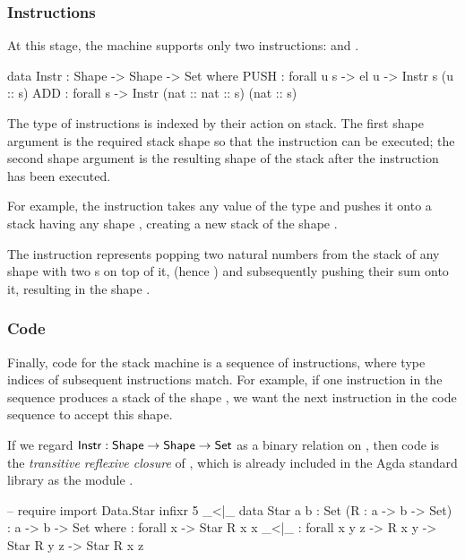 \subsubsection{Instructions}

At this stage, the machine supports only two instructions: 
and .
\begin{code}
  data Instr : Shape -> Shape -> Set where
    PUSH : forall {u s} -> el u -> Instr s (u :: s)
    ADD : forall s -> Instr (nat :: nat :: s) (nat :: s)
\end{code}
The type of instructions is indexed by their action on stack. The first shape
argument is the required stack shape so that the instruction can be executed;
the second shape argument is the resulting shape of the stack after the
instruction has been executed.

For example, the instruction  takes any value of the type 
and pushes it onto a stack having any shape , creating a new
stack of the shape .

The instruction  represents popping two natural numbers from the
stack of any shape with two s on top of it, (hence
)
and subsequently pushing their sum onto it, resulting in the shape
.

\subsubsection{Code}

Finally, code for the stack machine is a sequence of instructions, where
type indices of subsequent instructions match. For example, if one instruction
in the sequence produces a stack of the shape ,
we want the next instruction in the code sequence to accept this shape.

If we regard
$\mathsf{Instr} : \mathsf{Shape} \to \mathsf{Shape} \to \mathsf{Set}$
as a binary relation on , then code is the \emph{transitive reflexive closure}
of , which is already included in the Agda standard library as the
module .

\begin{code}
  -- require import Data.Star
  infixr 5 _<|\_
  data Star {a b : Set} (R : a -> b -> Set) : a -> b -> Set where
    \nil : forall {x} -> Star R x x
    _<|\_ : forall {x y z} -> R x y -> Star R y z -> Star R x z
\end{code}

